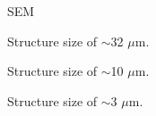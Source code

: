  \begin{figure}[!t]
 	\centering
 	\caption{SEM}
 	\label{fig:b2d41_q41}
 \end{figure}
%

\begin{figure*}[!t]
\centering
    \begin{subfigure}[t]{0.3\linewidth}
	\centering
	\caption{Structure size of $\sim$32 $\mu$m.}
	\label{fig:b2d4_q4}
\end{subfigure}
\hfill
    \begin{subfigure}[t]{0.3\linewidth}
	\centering
	\caption{Structure size of $\sim$10 $\mu$m.}
	\label{fig:b2d6_q6}
\end{subfigure}
\hfill
    \begin{subfigure}[t]{0.3\linewidth}
	\centering
	\caption{Structure size of $\sim$3 $\mu$m.}
	\label{fig:b2d8_q8}
\end{subfigure}
\end{figure*}
